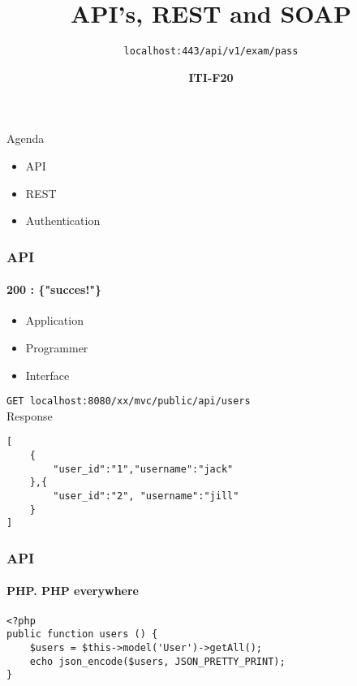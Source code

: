 \documentclass[aspectratio=169,10pt,t]{beamer}
\title{API's, REST and SOAP}
\subtitle{ \texttt{localhost:443/api/v1/exam/pass} }
\date{ }
\author{
  \textbf{ITI-F20}
}
\institute[
  SDU Robotics\\
  The Maersk Mc-Kinney Moller Institute\\
  University of Southern Denmark
] %
{%
  SDU Robotics\\
  The Maersk Mc-Kinney Moller Institute\\
  University of Southern Denmark

}
\begin{document}
{\SDUwavesbg%
\begin{frame} %
  \titlepage
\end{frame}}

\begin{frame}{Agenda}{\vphantom{(y}}
\begin{itemize}
		\item API
		\item REST
		\item Authentication
	\end{itemize}
\end{frame}


\begin{frame}[fragile]
	\frametitle{API}
	\framesubtitle{200 : \{"succes!"\}}
	\begin{itemize}
		\item Application
		\item Programmer
		\item Interface
	\end{itemize}

	\vfill
	\texttt{GET localhost:8080/xx/mvc/public/api/users}\\
	Response
	\begin{verbatim}
[
	{
		"user_id":"1","username":"jack"
	},{
		"user_id":"2", "username":"jill"
	}
]	
	\end{verbatim}
\end{frame}

\begin{frame}[fragile]
	\frametitle{API}
	\framesubtitle{PHP. PHP everywhere}
	\vfill
	\begin{verbatim}
<?php
public function users () {
	$users = $this->model('User')->getAll();
	echo json_encode($users, JSON_PRETTY_PRINT);
}
	\end{verbatim}
	\vfill
\end{frame}
\end{document}
